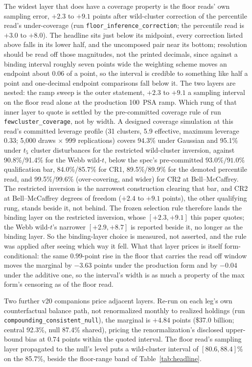 The widest layer that does have a coverage property is the floor reads' own sampling error, $+2.3$ to $+9.1$ points after wild-cluster correction of the percentile read's under-coverage (run \texttt{floor\_inference\_correction}; the percentile read is $+3.0$ to $+8.0$). The headline sits just below its midpoint, every correction listed above falls in its lower half, and the uncomposed pair near its bottom; resolution should be read off those magnitudes, not the printed decimals, since against a binding interval roughly seven points wide the weighting scheme moves an endpoint about $0.06$ of a point, so the interval is credible to something like half a point and one-decimal endpoint comparisons fall below it. The two layers are nested: the ramp sweep is the outer statement, $+2.3$ to $+9.1$ a sampling interval on the floor read alone at the production 100~PSA ramp. Which rung of that inner layer to quote is settled by the pre-committed coverage rule of run \texttt{fewcluster\_coverage}, not by width. A designed coverage simulation at this read's committed leverage profile (31 clusters, 5.9 effective, maximum leverage 0.33; 5{,}000 draws $\times$ 999 replications) covers 94.3\% under Gaussian and 95.1\% under $t_5$ cluster disturbances for the restricted wild-cluster inversion, against 90.8\%/91.4\% for the Webb wild-$t$, below the spec's pre-committed $93.0\%/91.0\%$ qualification bar, 84.0\%/85.7\% for CR1, 89.5\%/89.9\% for the demoted percentile read, and 99.5\%/99.6\% (over-covering, and wider) for CR2 at Bell--McCaffrey. The restricted inversion is the narrowest construction clearing that bar, and CR2 at Bell--McCaffrey degrees of freedom ($+2.4$ to $+9.1$ points), the other qualifying rung, stands beside it, not behind. The frozen selection rule therefore lands the binding layer on the restricted inversion, whose $[+2.3, +9.1]$ this paper quotes; the Webb wild-$t$'s narrower $[+2.9, +8.7]$ is reported beside it, no longer as the binding layer. So the binding-layer choice is measured, not asserted, and the rule was applied after seeing which way it fell. What that layer prices is itself form-conditional: the same $0.99$-point rise in the floor that carries the read off window moves the marginal by $-3.63$ points under the production form and by $-0.04$ under the additive one, so the interval's width is as much a property of the max form's censoring as of the floor read.

Two further v20 companions price adjacent layers. Re-run on each leg's own counterfactual balance path, not renormalized monthly to realized holdings (run \texttt{compounding\_consistent\_null}), the marginal is $+4.84$ points (\$37.0 billion; central 92.3\%, null 87.4\% shared), pricing the renormalization's disclosed upper-bound bias at $0.74$ points within the quoted interval. The floor read's sampling layer propagated to the null's level puts a wild-cluster interval of $[80.6, 88.4]$\% on the 85.7\%, beside the floor-range band of Table~\ref{tab:headline}.

